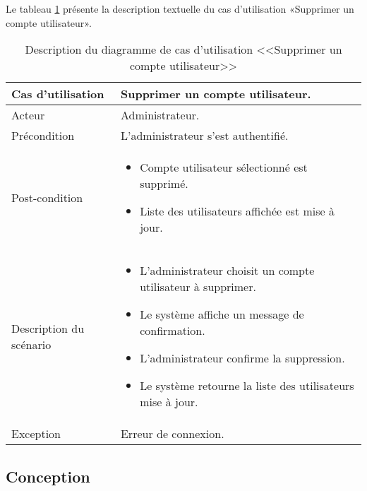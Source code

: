  Le tableau \ref{tab:SupprimerCompteUtilisateur} présente la description textuelle du cas d’utilisation «Supprimer un compte utilisateur».
\begin{longtable}[c]{
    |p{}
    |p{}|
}
    \caption{Description du diagramme de cas d’utilisation <<Supprimer un compte utilisateur>>}
    \label{tab:SupprimerCompteUtilisateur}\\
    \hline
    
    Cas d’utilisation
    &  Supprimer un compte utilisateur. \\
    \hline 
    
    Acteur
    & Administrateur. \\
    \hline 
    
    Précondition
    & L’administrateur s’est authentifié. \\
    \hline
    
    Post-condition
    &     \begin{itemize}
    \item Compte utilisateur sélectionné est supprimé.
     \item Liste des utilisateurs affichée est mise à jour.
    \end{itemize} \\
    \hline
    
    Description du
scénario

    &      \begin{itemize}
    \item L’administrateur choisit un compte utilisateur à supprimer.
    \item Le système affiche un message de confirmation.
     \item L’administrateur confirme la suppression.
     \item Le système retourne la liste des utilisateurs mise à jour.
    \end{itemize}  \\
    \hline
    
   Exception
    & Erreur de connexion.
 \\ \hline
   
\end{longtable}
\newpage
\subsection{Conception}
